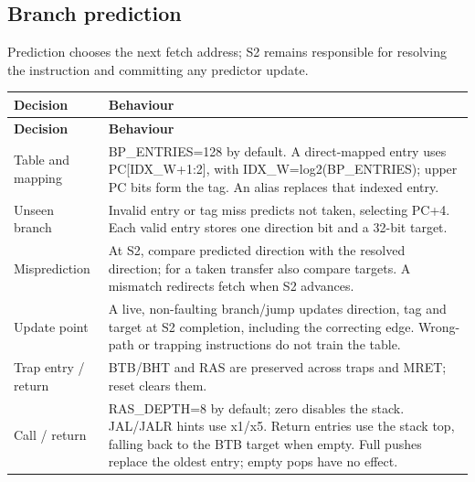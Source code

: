 \documentclass[11pt]{article}
\begin{document}
\subsection{Branch prediction}
\noindent Prediction chooses the next fetch address; S2 remains responsible for resolving the instruction and committing any predictor update.\par\medskip
{\small
\begin{longtable}{@{}L{0.2500\dimexpr\linewidth-12pt\relax}L{0.7500\dimexpr\linewidth-12pt\relax}@{}}
\toprule
\textbf{Decision} & \textbf{Behaviour} \\ \midrule
\endfirsthead
\toprule
\textbf{Decision} & \textbf{Behaviour} \\ \midrule
\endhead
Table and mapping & BP\_ENTRIES=128 by default. A direct-mapped entry uses PC[IDX\_W+1:2], with IDX\_W=log2(BP\_ENTRIES); upper PC bits form the tag. An alias replaces that indexed entry. \\ \addlinespace[3pt]
Unseen branch & Invalid entry or tag miss predicts not taken, selecting PC+4. Each valid entry stores one direction bit and a 32-bit target. \\ \addlinespace[3pt]
Misprediction & At S2, compare predicted direction with the resolved direction; for a taken transfer also compare targets. A mismatch redirects fetch when S2 advances. \\ \addlinespace[3pt]
Update point & A live, non-faulting branch/jump updates direction, tag and target at S2 completion, including the correcting edge. Wrong-path or trapping instructions do not train the table. \\ \addlinespace[3pt]
Trap entry / return & BTB/BHT and RAS are preserved across traps and MRET; reset clears them. \\ \addlinespace[3pt]
Call / return & RAS\_DEPTH=8 by default; zero disables the stack. JAL/JALR hints use x1/x5. Return entries use the stack top, falling back to the BTB target when empty. Full pushes replace the oldest entry; empty pops have no effect. \\*
\bottomrule\end{longtable}}

\end{document}

